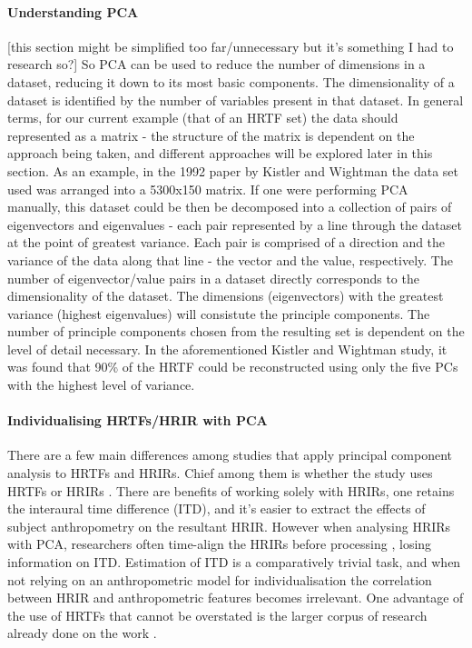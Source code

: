 \paragraph{Understanding PCA}
[this section might be simplified too far/unnecessary but it's something I had to research so?]
So PCA can be used to reduce the number of dimensions in a dataset, reducing it down to its most basic components. The dimensionality of a dataset is identified by the number of variables present in that dataset. In general terms, for our current example (that of an HRTF set) the data should represented as a matrix - the structure of the matrix is dependent on the approach being taken, and different approaches will be explored later in this section. As an example, in the 1992 paper by Kistler and Wightman \citep{Kistler1992} the data set used was arranged into a 5300x150 matrix. If one were performing PCA manually, this dataset could be then be decomposed into a collection of pairs of eigenvectors and eigenvalues - each pair represented by a line through the dataset at the point of greatest variance. Each pair is comprised of a direction and the variance of the data along that line - the vector and the value, respectively. The number of eigenvector/value pairs in a dataset directly corresponds to the dimensionality of the dataset. The dimensions (eigenvectors) with the greatest variance (highest eigenvalues) will consistute the principle components. The number of principle components chosen from the resulting set is dependent on the level of detail necessary. In the aforementioned Kistler and Wightman study, it was found that 90\% of the HRTF could be reconstructed using only the five PCs with the highest level of variance. 


\paragraph{Individualising HRTFs/HRIR with PCA}
There are a few main differences among studies that apply principal component analysis to HRTFs and HRIRs. Chief among them is whether the study uses HRTFs \citep{Holzl2014a} \citep{Gutierrez-Parera2017} or HRIRs \citep{Hwang2008} \citep{Hwang2007} \citep{Fink2012}. There are benefits of working solely with HRIRs, one retains the interaural time difference (ITD), and it's easier to extract the effects of subject anthropometry on the resultant HRIR. However when analysing HRIRs with PCA, researchers often time-align the HRIRs before processing \citep{hwang2010customization}, losing information on ITD. Estimation of ITD is a comparatively trivial task, and when not relying on an anthropometric model for individualisation the correlation between HRIR and anthropometric features becomes irrelevant. One advantage of the use of HRTFs that cannot be overstated is the larger corpus of research already done on the work \citep{Holzl2014a}. 

